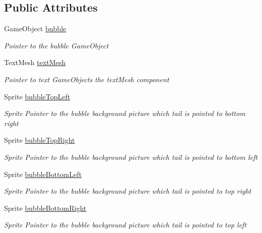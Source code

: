 \subsection*{Public Attributes}
\begin{DoxyCompactItemize}
\item 
Game\+Object \hyperlink{classdoki_unity_1_1_bubble_manager_a2d824d0cb314e7144259625dd57bac06}{bubble}
\begin{DoxyCompactList}\small\item\em Pointer to the bubble Game\+Object \end{DoxyCompactList}\item 
Text\+Mesh \hyperlink{classdoki_unity_1_1_bubble_manager_acde82ad6bddebc164ffb6965fe7b95bd}{text\+Mesh}
\begin{DoxyCompactList}\small\item\em Pointer to text Game\+Object\textquotesingle{}s the text\+Mesh component \end{DoxyCompactList}\item 
Sprite \hyperlink{classdoki_unity_1_1_bubble_manager_ae3946419cd506ed5cfa4fa6d842be559}{bubble\+Top\+Left}
\begin{DoxyCompactList}\small\item\em Sprite Pointer to the bubble background picture which tail is pointed to bottom right \end{DoxyCompactList}\item 
Sprite \hyperlink{classdoki_unity_1_1_bubble_manager_a86211a4fce86b42ed009c0c0103ff277}{bubble\+Top\+Right}
\begin{DoxyCompactList}\small\item\em Sprite Pointer to the bubble background picture which tail is pointed to bottom left \end{DoxyCompactList}\item 
Sprite \hyperlink{classdoki_unity_1_1_bubble_manager_aaee84a273a206b4e76f22ef28c7cca9b}{bubble\+Bottom\+Left}
\begin{DoxyCompactList}\small\item\em Sprite Pointer to the bubble background picture which tail is pointed to top right \end{DoxyCompactList}\item 
Sprite \hyperlink{classdoki_unity_1_1_bubble_manager_ae938e7f1488fcd5c9102b2099ed05e7b}{bubble\+Bottom\+Right}
\begin{DoxyCompactList}\small\item\em Sprite Pointer to the bubble background picture which tail is pointed to top left \end{DoxyCompactList}\end{DoxyCompactItemize}


